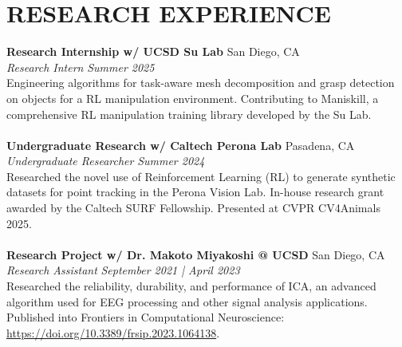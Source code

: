 \documentclass[letterpaper,10pt]{extarticle}
\begin{document}
\section*{RESEARCH EXPERIENCE}
\textbf{Research Internship w/ UCSD Su Lab} \hfill San Diego, CA\\ %
\textit{Research Intern} \hfill \textit{Summer 2025} \\%
Engineering algorithms for task-aware mesh decomposition and grasp detection on objects for a RL manipulation environment. Contributing to Maniskill, a comprehensive RL manipulation training library developed by the Su Lab.  \\\\
\noindent
\textbf{Undergraduate Research w/ Caltech Perona Lab} \hfill Pasadena, CA\\ %
\textit{Undergraduate Researcher} \hfill \textit{Summer 2024} \\%
Researched the novel use of Reinforcement Learning (RL) to generate synthetic datasets for point tracking in the Perona Vision Lab. In-house research grant awarded by the Caltech SURF Fellowship. Presented at CVPR CV4Animals 2025. \\\\
\noindent
\noindent
\textbf{Research Project w/ Dr. Makoto Miyakoshi @ UCSD} \hfill San Diego, CA\\ %
\textit{Research Assistant} \hfill \textit{September 2021 | April 2023} \\%
Researched the reliability, durability, and performance of ICA, an advanced algorithm used for EEG processing and other signal analysis applications. Published into Frontiers in Computational Neuroscience: \href{https://doi.org/10.3389/frsip.2023.1064138}{https://doi.org/10.3389/frsip.2023.1064138}.
\end{document}
